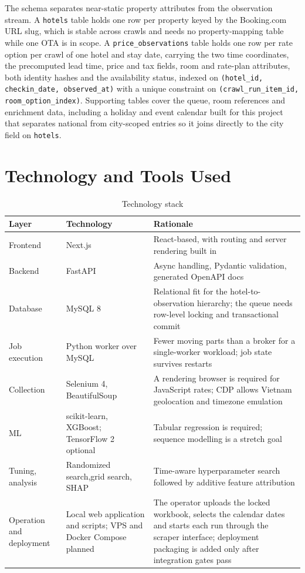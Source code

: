 The schema separates near-static property attributes from the observation stream. A \texttt{hotels} table holds one row per property keyed by the Booking.com URL slug, which is stable across crawls and needs no property-mapping table while one OTA is in scope. A \texttt{price\_observations} table holds one row per rate option per crawl of one hotel and stay date, carrying the two time coordinates, the precomputed lead time, price and tax fields, room and rate-plan attributes, both identity hashes and the availability status, indexed on \texttt{(hotel\_id, checkin\_date, observed\_at)} with a unique constraint on \texttt{(crawl\_run\_item\_id, room\_option\_index)}. Supporting tables cover the queue, room references and enrichment data, including a holiday and event calendar built for this project that separates national from city-scoped entries so it joins directly to the city field on \texttt{hotels}.

\section{Technology and Tools Used}

\begin{table}[!htbp]
\centering
\caption{Technology stack}
\label{tab:stack}
\begin{tabular}{|p{2.4cm}|p{3.4cm}|p{7.6cm}|}
\hline
\textbf{Layer} & \textbf{Technology} & \textbf{Rationale} \\
\hline
Frontend & Next.js & React-based, with routing and server rendering built in \\
\hline
Backend & FastAPI & Async handling, Pydantic validation, generated OpenAPI docs \\
\hline
Database & MySQL 8 & Relational fit for the hotel-to-observation hierarchy; the queue needs row-level locking and transactional commit \\
\hline
Job execution & Python worker over MySQL & Fewer moving parts than a broker for a single-worker workload; job state survives restarts \\
\hline
Collection & Selenium 4, BeautifulSoup & A rendering browser is required for JavaScript rates; CDP allows Vietnam geolocation and timezone emulation \\
\hline
ML & scikit-learn, XGBoost; TensorFlow 2 optional & Tabular regression is required; sequence modelling is a stretch goal \\
\hline
Tuning, analysis & Randomized search,\newline grid search, SHAP & Time-aware hyperparameter search followed by additive feature attribution \citep{lundberg2017} \\
\hline
Operation and deployment & Local web application and scripts; VPS and Docker Compose planned & The operator uploads the locked workbook, selects the calendar dates and starts each run through the scraper interface; deployment packaging is added only after integration gates pass \\
\hline
\end{tabular}
\end{table}

